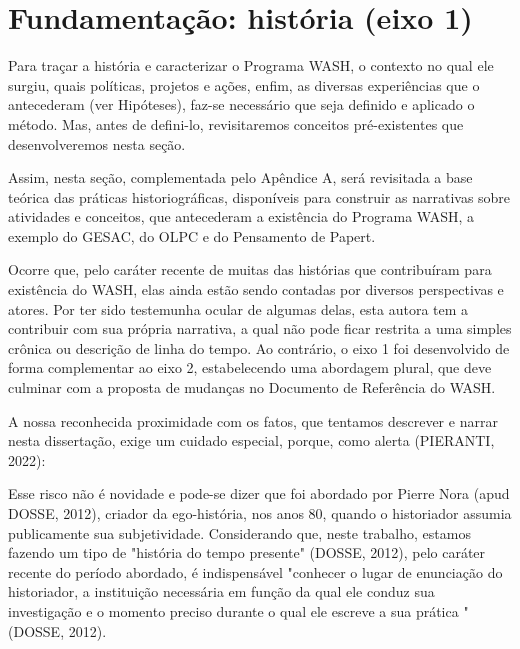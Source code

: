 \section[Fundamentação: história (eixo 1)]{Fundamentação: história (eixo 1)}\label{Fundamentação: história (eixo 1)}
Para traçar a história e caracterizar o Programa WASH, o contexto no qual ele surgiu, quais políticas, projetos e ações, enfim, as diversas experiências que o antecederam (ver Hipóteses), faz-se  necessário que seja definido e aplicado o método. Mas, antes de defini-lo, revisitaremos conceitos pré-existentes que  desenvolveremos nesta seção.

Assim, nesta seção, complementada pelo Apêndice A, será revisitada a base teórica das práticas historiográficas, disponíveis para construir as narrativas sobre atividades e conceitos, que antecederam a existência do Programa WASH, a exemplo do GESAC, do OLPC e do Pensamento de Papert.



Ocorre que, pelo caráter recente de muitas das histórias que contribuíram para existência do WASH, elas ainda estão sendo contadas por diversos perspectivas e atores. Por ter sido testemunha ocular de algumas delas, esta autora tem a contribuir com sua própria narrativa, a qual não pode ficar restrita a uma simples crônica ou descrição de linha do tempo. Ao contrário, o eixo 1 foi desenvolvido de forma complementar ao eixo 2, estabelecendo uma abordagem plural, que deve culminar com a proposta de mudanças no Documento de Referência do WASH.

A nossa reconhecida proximidade com os fatos, que tentamos descrever e narrar nesta dissertação, exige um cuidado especial, porque, como alerta  (PIERANTI, 2022):


\noindent\begin{center}\mbox{\centering{}}\end{center}


Esse risco não é novidade e pode-se dizer que foi abordado por Pierre Nora  (apud DOSSE, 2012), criador da ego-história, nos anos 80, quando o historiador assumia publicamente sua subjetividade. Considerando que, neste trabalho, estamos fazendo um tipo de "história do tempo presente"  (DOSSE, 2012), pelo caráter recente do período abordado, é indispensável "conhecer o lugar de enunciação do historiador, a instituição necessária em função da qual ele conduz sua investigação e o momento preciso durante o qual ele escreve a sua prática "  (DOSSE, 2012).

